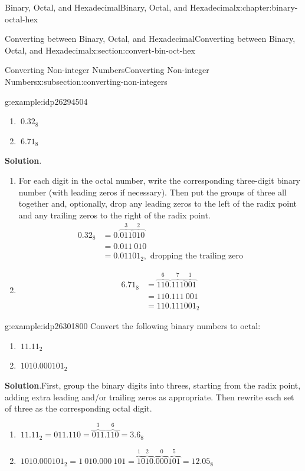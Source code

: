 \documentclass[twoside,10pt,]{book}
\newcommand{\blocktitlefont}{\relax}
\numberwithin{equation}{section}
\newcommand{\amp}{&}
\begin{document}
\begin{chapterptx}{Binary, Octal, and Hexadecimal}{}{Binary, Octal, and Hexadecimal}{}{}{x:chapter:binary-octal-hex}
\begin{sectionptx}{Converting between Binary, Octal, and Hexadecimal}{}{Converting between Binary, Octal, and Hexadecimal}{}{}{x:section:convert-bin-oct-hex}
\begin{subsectionptx}{Converting Non-integer Numbers}{}{Converting Non-integer Numbers}{}{}{x:subsection:converting-non-integers}
\begin{example}{}{g:example:idp26294504}
\begin{enumerate}
\item{}\(\displaystyle \ 0.32_8\)%
\item{}\(\displaystyle \ 6.71_8\)%
\end{enumerate}
\par\smallskip%
\noindent\textbf{\blocktitlefont Solution}.\label{g:solution:idp26297576}{}\hypertarget{g:solution:idp26297576}{}\quad{}%
\begin{enumerate}
\item{}For each digit in the octal number, write the corresponding three-digit binary number (with leading zeros if necessary).  Then put the groups of three all together and, optionally, drop any leading zeros to the left of the radix point and any trailing zeros to the right of the radix point.%
%
\begin{align*}
0.32_8 \amp = 0.\overbrace{011}^3\overbrace{010}^2\\
\amp = 0.011\ 010\\
\amp = 0.01101_2,\text{ dropping the trailing zero}
\end{align*}
\item{}%
\begin{align*}
6.71_8 \amp = \overbrace{110}^6.\overbrace{111}^7\overbrace{001}^1\\
\amp = 110.111\ 001\\
\amp = 110.111001_2
\end{align*}
%
\end{enumerate}
\end{example}
\begin{example}{}{g:example:idp26301800}%
Convert the following binary numbers to octal: %
\begin{enumerate}
\item{}\(\displaystyle \ 11.11_2\)%
\item{}\(\displaystyle \ 1010.000101_2\)%
\end{enumerate}
\par\smallskip%
\noindent\textbf{\blocktitlefont Solution}.\label{g:solution:idp26298088}{}\hypertarget{g:solution:idp26298088}{}\quad{}First, group the binary digits into threes, starting from the radix point, adding extra leading and\slash{}or trailing zeros as appropriate.  Then rewrite each set of three as the corresponding octal digit.%
%
\begin{enumerate}
\item{}\(\displaystyle \ 11.11_2 = 011.110=\overbrace{011}^3.\overbrace{110}^6=3.6_8\)%
\item{}\(\displaystyle \ 1010.000101_2=1\ 010.000\ 101=\overbrace{1}^1\overbrace{010}^2.\overbrace{000}^0\overbrace{101}^5=12.05_8\)%

\end{enumerate}
\end{example}
\end{subsectionptx}
\end{sectionptx}
\end{chapterptx}
\end{document}
